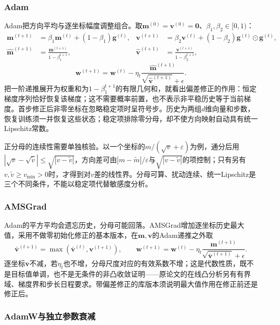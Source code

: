 \subsubsection{Adam}

Adam把方向平均与逐坐标幅度调整组合。取$\bm m^{(0)}=\bm v^{(0)}=\bm0$、$\beta_1,\beta_2\in[0,1)$：
\begin{align*}
 \bm m^{(t+1)}&=\beta_1\bm m^{(t)}+(1-\beta_1)\bm g^{(t)},&
 \bm v^{(t+1)}&=\beta_2\bm v^{(t)}+(1-\beta_2)\bm g^{(t)}\odot\bm g^{(t)},\\
 \widehat{\bm m}^{(t+1)}&=\frac{\bm m^{(t+1)}}{1-\beta_1^{t+1}},&
 \widehat{\bm v}^{(t+1)}&=\frac{\bm v^{(t+1)}}{1-\beta_2^{t+1}},
\end{align*}
\[
 \bm w^{(t+1)}=\bm w^{(t)}
 -\eta_t\frac{\widehat{\bm m}^{(t+1)}}{\sqrt{\widehat{\bm v}^{(t+1)}}+\epsilon}.
\]
把一阶递推展开为权重和为$1-\beta_1^{t+1}$的有限几何和，就看出偏差修正的作用：恒定梯度序列恰好恢复该梯度；这不需要概率前置，也不表示非平稳历史等于当前梯度。首步修正后非零坐标在忽略稳定项时呈符号步。历史为两组$d$维向量和步数，恢复训练须一并恢复这些状态；稳定项排除零分母，却不使方向映射自动具有统一Lipschitz常数。

正分母的连续性需要单独核验。以一个坐标的$m/(\sqrt v+\varepsilon)$为例，通分后用$|\sqrt v-\sqrt{\widetilde v}|\leq\sqrt{|v-\widetilde v|}$，方向差可由$|m-\widetilde m|/\varepsilon$与$\sqrt{|v-\widetilde v|}$的项控制；只有另有$v,\widetilde v\geq v_{\min}>0$时，才得到对$v$差的线性界。分母可算、扰动连续、统一Lipschitz是三个不同条件，不能以稳定项代替敏感度分析。

\subsubsection{AMSGrad}

Adam的平方平均会遗忘历史，分母可能回落。AMSGrad增加逐坐标历史最大值，采用不做零初始化修正的基本版本，在$\bm m,\bm v$的Adam递推之外取
\[
 \bar{\bm v}^{(t+1)}=\max(\bar{\bm v}^{(t)},\bm v^{(t+1)}),\qquad
 \bm w^{(t+1)}=\bm w^{(t)}
 -\eta_t\frac{\bm m^{(t+1)}}{\sqrt{\bar{\bm v}^{(t+1)}}+\epsilon}.
\]
逐坐标$\bar{\bm v}$不减，若$\eta_t$也不增，分母尺度对应的有效系数不增；这是代数性质，既不是目标值单调，也不是无条件的非凸收敛证明——原论文的在线凸分析另有有界域、梯度界和步长日程要求。带偏差修正的库版本须说明最大值作用在修正前还是修正后。

\subsubsection{AdamW与独立参数衰减}

